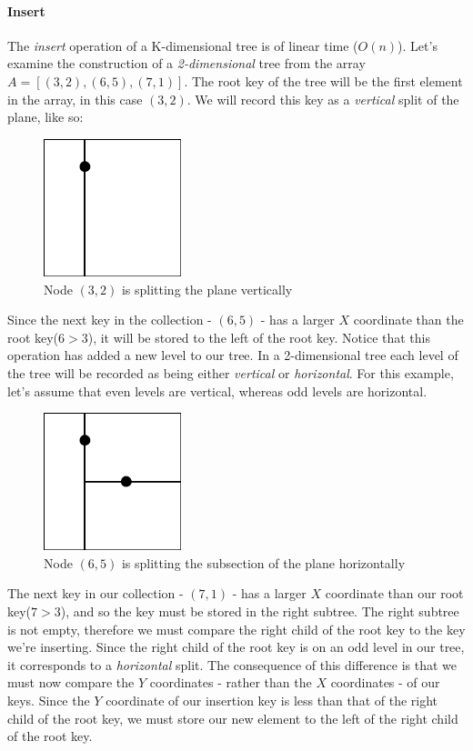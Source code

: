 \documentclass{article}
\begin{document}
\paragraph{Insert}
The {\em insert} operation of a K-dimensional tree is of linear time (\(O(n)\)).
Let's examine the construction of a {\em 2-dimensional} tree from the array \(A = [(3, 2), (6, 5), (7, 1)]\).
The root key of the tree will be the first element in the array, in this case \((3, 2)\).
We will record this key as a {\em vertical} split of the plane, like so:

\begin{figure}[H]
  \centering
  \includegraphics[width=4cm]{2d_tree_0}
  \caption{Node \((3, 2)\) is splitting the plane vertically}
\end{figure}

Since the next key in the collection - \((6, 5)\) - has a larger \(X\) coordinate than the root key(\(6 > 3\)),
it will be stored to the left of the root key. Notice that this operation has added a new level to our tree.
In a 2-dimensional tree each level of the tree will be recorded as being either {\em vertical} or {\em horizontal}.
For this example, let's assume that even levels are vertical, whereas odd levels are horizontal.

\begin{figure}[H]
  \centering
  \includegraphics[width=4cm]{2d_tree_1}
  \caption{Node \((6, 5)\) is splitting the subsection of the plane horizontally}
\end{figure}

The next key in our collection - \((7, 1)\) - has a larger \(X\) coordinate than our root key(\(7 > 3\)),
and so the key must be stored in the right subtree. The right subtree is not empty,
therefore we must compare the right child of the root key to the key we're inserting.
Since the right child of the root key is on an odd level in our tree, it corresponds to a {\em horizontal} split.
The consequence of this difference is that we must now compare the \(Y\) coordinates - rather than the \(X\)
coordinates - of our keys. Since the \(Y\) coordinate of our insertion key is less than that of the right child
of the root key, we must store our new element to the left of the right child of the root key.
\end{document}
